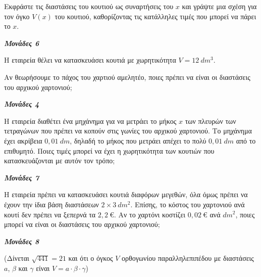 \documentclass[11pt,a4paper,twoside]{book}
\newcommand{\monades}[1]{
\hspace*{\fill}
\textbf{\textit{\textcolor{maincolor}{Μονάδες #1}}}}
\begin{document}
\begin{alist}
\item Εκφράστε τις διαστάσεις του κουτιού ως συναρτήσεις του $x$ και γράψτε μια σχέση για τον όγκο $V(x)$ του κουτιού, καθορίζοντας τις κατάλληλες τιμές που μπορεί να πάρει το $x$.
\monades{6}
\item Η εταιρεία θέλει να κατασκευάσει κουτιά με χωρητικότητα $V = 12\ dm^{3}$.

\begin{rlist}
\item Αν θεωρήσουμε το πάχος του χαρτιού αμελητέο, ποιες πρέπει να είναι οι διαστάσεις του αρχικού χαρτονιού;
\monades{4}
\item Η εταιρεία διαθέτει ένα μηχάνημα για να μετράει το μήκος $x$ των πλευρών των τετραγώνων που πρέπει να κοπούν στις γωνίες του αρχικού χαρτονιού. Το μηχάνημα έχει ακρίβεια $0{,}01\ dm$, δηλαδή το μήκος που μετράει απέχει το πολύ $0{,}01\ dm$ από το επιθυμητό. Ποιες τιμές μπορεί να έχει η χωρητικότητα των κουτιών που κατασκευάζονται με αυτόν τον τρόπο;
\monades{7}
\end{rlist}
\item Η εταιρεία πρέπει να κατασκευάσει κουτιά διαφόρων μεγεθών, όλα όμως πρέπει να έχουν την ίδια βάση διαστάσεων $2 \times 3\ dm^{2}$. Επίσης, το κόστος του χαρτονιού ανά κουτί δεν πρέπει να ξεπερνά τα $2{,}2\ \euro$. Αν το χαρτόνι κοστίζει $0{,}02\ \euro$ ανά $dm^{2}$, ποιες μπορεί να είναι οι διαστάσεις του αρχικού χαρτονιού;
\monades{8}

(Δίνεται $\sqrt{441} = 21$ και ότι ο όγκος $V$ ορθογωνίου παραλληλεπιπέδου με διαστάσεις $a$, $\beta$ και $\gamma$ είναι $V = a \cdot \beta \cdot \gamma$)
\end{alist}

\vspace{4mm}
\end{document}
